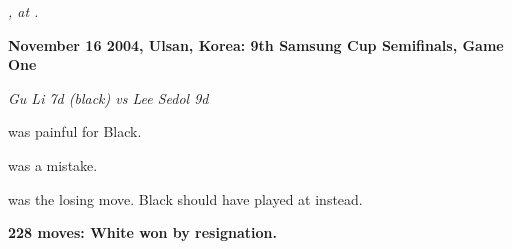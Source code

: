 \documentclass[letterpaper,12pt]{memoir}
\newcommand{\subtext}[1]{\centerline{\textit{#1}}}
\begin{document}
\subtext{{}, {\raisebox{-.17em}{\textnormal{{\gnoswi\char90}}}} at {\raisebox{-.17em}{\textnormal{\gnosOverlap{!}{\small{2}}}}}.}

\textbf{November 16 2004, Ulsan, Korea: 9th Samsung Cup Semifinals, Game One}

\textit{Gu Li 7d (black) vs Lee Sedol 9d}

{} was painful for Black.

{} was a mistake.

{} was the losing move. Black should have played {} at {} instead.

\textbf{228 moves: White won by resignation.}


\vfill
\end{document}
